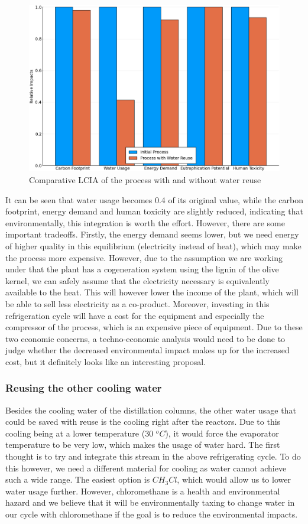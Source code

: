 \documentclass[11pt]{article}
\begin{document}
\begin{figure}[htbp]
\centering
\includegraphics[width=.9\linewidth]{./lcia_comparison_reuse.png}
\caption{Comparative LCIA of the process with and without water reuse}
\end{figure}

It can be seen that water usage becomes 0.4 of its original value, while the carbon footprint, energy demand and human toxicity are slightly reduced, indicating that environmentally, this integration is worth the effort. However, there are some important tradeoffs. Firstly, the energy demand seems lower, but we need energy of higher quality in this equilibrium (electricity instead of heat), which may make the process more expensive. However, due to the assumption we are working under that the plant has a cogeneration system using the lignin of the olive kernel, we can safely assume that the electricity necessary is equivalently available to the heat. This will however lower the income of the plant, which will be able to sell less electricity as a co-product. Moreover, investing in this refrigeration cycle will have a cost for the equipment and especially the compressor of the process, which is an expensive piece of equipment. Due to these two economic concerns, a techno-economic analysis would need to be done to judge whether the decreased environmental impact makes up for the increased cost, but it definitely looks like an interesting proposal.

\subsubsection{Reusing the other cooling water}
\label{sec:org5b6d4fa}
Besides the cooling water of the distillation columns, the other water usage that could be saved with reuse is the cooling right after the reactors. Due to this cooling being at a lower temperature (30 \(^oC\)), it would force the evaporator temperature to be very low, which makes the usage of water hard. The first thought is to try and integrate this stream in the above refrigerating cycle. To do this however, we need a different material for cooling as water cannot achieve such a wide range. The easiest option is \(CH_3Cl\), which would allow us to lower water usage further. However, chloromethane is a health and environmental hazard and we believe that it will be environmentally taxing to change water in our cycle with chloromethane if the goal is to reduce the environmental impacts.
\end{document}
